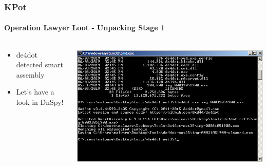 \documentclass[aspectratio=169]{beamer}
\begin{document}
{
\begin{frame}
  \frametitle{KPot}
  \framesubtitle{Operation Lawyer Loot - Unpacking Stage 1}
  \begin{columns}
    \begin{column}{.3\textwidth}
      \begin{itemize}
      \item{de4dot detected smart assembly}
      \item{Let's have a look in DnSpy!}
      \end{itemize}
    \end{column}
    \hfill
    \begin{column}{.7\textwidth}
      \begin{center}
        \includegraphics[scale=1.75]{kpot-unpacking-3}
      \end{center}
    \end{column}
  \end{columns}
\end{frame}
}
\end{document}
